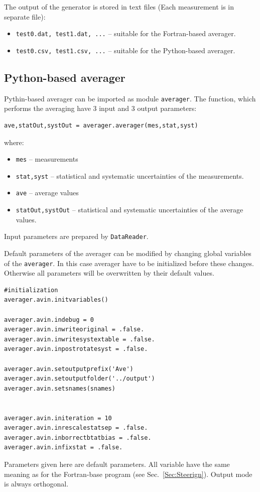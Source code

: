 The output of the generator is stored in text files (Each measurement is in separate file):
\begin{itemize}
\item {\tt test0.dat, test1.dat, ...} -- suitable for the Fortran-based averager.
\item {\tt test0.csv, test1.csv, ...} -- suitable for the Python-based averager.
\end{itemize}

\subsection{Python-based averager}
\label{Sec:PythonUsing}

Pythin-based averager can be imported as module {\tt averager}. The function, which performs the averaging have 3 input and 3 output parameters:
\begin{verbatim}
ave,statOut,systOut = averager.averager(mes,stat,syst)
\end{verbatim}
where:

\begin{itemize}
\item {\tt mes} -- measurements
\item {\tt stat,syst} -- statistical and systematic uncertainties of the measurements.
\item {\tt ave} -- average values
\item {\tt statOut,systOut} -- statistical and systematic uncertainties of the average values.
\end{itemize}
Input parameters are prepared by {\tt DataReader}.

Default parameters of the averager can be modified by changing global variables of the {\tt averager}. In this case averager have to be initialized before these changes. Otherwise all parameters will be overwritten by their default values.

\begin{verbatim}
#initialization
averager.avin.initvariables()

averager.avin.indebug = 0
averager.avin.inwriteoriginal = .false.
averager.avin.inwritesystextable = .false.
averager.avin.inpostrotatesyst = .false.

averager.avin.setoutputprefix('Ave')
averager.avin.setoutputfolder('../output')
averager.avin.setsnames(snames)


averager.avin.initeration = 10
averager.avin.inrescalestatsep = .false.
averager.avin.inborrectbtatbias = .false.
averager.avin.infixstat = .false.
\end{verbatim}
Parameters given here are default parameters. All variable have the same meaning as for the Fortran-base program (see Sec.~\ref{Sec:Steerign}). Output mode is always orthogonal.

